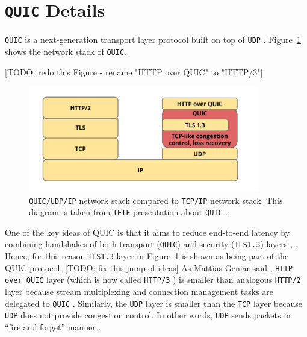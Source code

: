 \documentclass[12pt,a4paper,twoside,openright]{report}
\begin{document}
\section{\texttt{QUIC} Details} \label{QUIC_details_section}

\texttt{QUIC} is a next-generation transport layer protocol built on top of \texttt{UDP} \cite{chromium_blog_about_quic}.
Figure~\ref{fig:QUIC_network_stack} shows the network stack of \texttt{QUIC}.

[TODO: redo this Figure - rename "HTTP over QUIC" to "HTTP/3"]
    \begin{figure}[ht]
    \centering
    \includegraphics[width=0.9\textwidth]{figs/QUIC_network_stack.PNG}
    \caption{\texttt{QUIC/UDP/IP} network stack compared to \texttt{TCP/IP} network stack. This diagram is taken from \texttt{IETF} presentation about \texttt{QUIC} \cite{IETF_presentation_about_QUIC}.}
    \label{fig:QUIC_network_stack}
    \end{figure}

One of the key ideas of QUIC is that it aims to reduce end-to-end latency by combining handshakes of both transport (\texttt{QUIC}) and security (\texttt{TLS1.3}) layers \cite{Google_QUIC_protocol_moving_the_web_from_TCP_to_UDP}, \cite{HTTP_3_the_past_the_present_and_the_future}. Hence, for this reason \texttt{TLS1.3} layer in Figure~\ref{fig:QUIC_network_stack} is shown as being part of the QUIC protocol. 
[TODO: fix this jump of ideas]
As Mattias Geniar said \cite{Google_QUIC_protocol_moving_the_web_from_TCP_to_UDP},
\texttt{HTTP over QUIC} layer (which is now called \texttt{HTTP/3} \cite{HTTP_3_the_past_the_present_and_the_future}) is smaller than analogous \texttt{HTTP/2} layer because stream multiplexing and connection management tasks are delegated to \texttt{QUIC} \cite{bib_grigorik2013}.
Similarly, the \texttt{UDP} layer is smaller than the \texttt{TCP} layer because \texttt{UDP} does not provide congestion control. 
In other words, \texttt{UDP} sends packets in \enquote{fire and forget} manner \cite{Google_QUIC_protocol_moving_the_web_from_TCP_to_UDP}.
\end{document}
